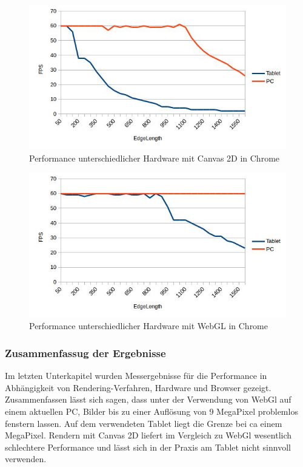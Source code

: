 \begin{figure}[pt]
	\centering
	\includegraphics[width=0.7\linewidth]{img/c4_stat_hardware_js_chrome.jpg}
	\caption{Performance unterschiedlicher Hardware mit Canvas 2D in Chrome}
	\label{fig:stat_hardware_js_chrome}
\end{figure}

\begin{figure}[pt]
	\centering
	\includegraphics[width=0.7\linewidth]{img/c4_stat_hardware_webgl_chrome.jpg}
	\caption{Performance unterschiedlicher Hardware mit WebGL in Chrome}
	\label{fig:stat_hardware_webgl_chrome}
\end{figure}

\subsubsection{Zusammenfassug der Ergebnisse}
Im letzten Unterkapitel wurden Messergebnisse für die Performance in Abhängigkeit von Rendering-Verfahren, Hardware und Browser gezeigt.
Zusammenfassen lässt sich sagen, 
dass unter der Verwendung von WebGl auf einem aktuellen PC, 
Bilder bis zu einer Auflösung von 9 MegaPixel problemlos fenstern lassen.
Auf dem verwendeten Tablet liegt die Grenze bei ca einem MegaPixel.
Rendern mit Canvas 2D liefert im Vergleich zu WebGl wesentlich schlechtere Performance und lässt sich in der Praxis am Tablet nicht sinnvoll verwenden.


